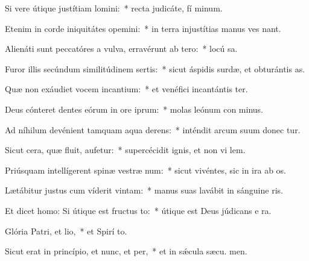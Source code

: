 \item Si vere útique justítiam lomini:~* recta judicáte, fí minum.
\item Etenim in corde iniquitátes opemini:~* in terra injustítias manus ves nant.
\item Alienáti sunt peccatóres a vulva, erravérunt ab tero:~* locú  sa.
\item Furor illis secúndum similitúdinem sertis:~* sicut áspidis surdæ, et obturántis  as.
\item Quæ non exáudiet vocem incantium:~* et venéfici incantántis ter.
\item Deus cónteret dentes eórum in ore iprum:~* molas leónum con minus.
\item Ad níhilum devénient tamquam aqua derens:~* inténdit arcum suum donec tur.
\item Sicut cera, quæ fluit, aufetur:~* supercécidit ignis, et non vi lem.
\item Priúsquam intellígerent spinæ vestræ num:~* sicut vivéntes, sic in ira ab os.
\item Lætábitur justus cum víderit vintam:~* manus suas lavábit in sánguine ris.
\item Et dicet homo: Si útique est fructus to:~* útique est Deus júdicans e  ra.
\item Glória Patri, et lio,~* et Spirí to.
\item Sicut erat in princípio, et nunc, et per,~* et in sǽcula sæcu. men.
